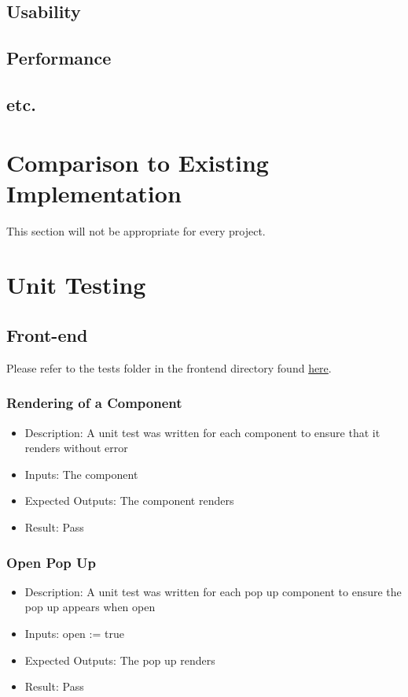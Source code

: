 \documentclass[12pt, titlepage]{article}
\begin{document}
\subsection{Usability}
		
\subsection{Performance}

\subsection{etc.}
	
\section{Comparison to Existing Implementation}	

This section will not be appropriate for every project.

\section{Unit Testing}
\subsection{Front-end}
Please refer to the tests folder in the frontend directory found \href{https://github.com/OKKM-insights/frontend/tree/main/tests/__tests__}{here}.
\subsubsection{Rendering of a Component}
\begin{itemize}
    \item Description: A unit test was written for each component to ensure that it renders without error
    \item Inputs: The component
    \item Expected Outputs: The component renders 
    \item Result: Pass
\end{itemize}
\subsubsection{Open Pop Up}
\begin{itemize}
    \item Description: A unit test was written for each pop up component to ensure the pop up appears when open
    \item Inputs: open := true
    \item Expected Outputs: The pop up renders 
    \item Result: Pass
\end{itemize}
\end{document}
